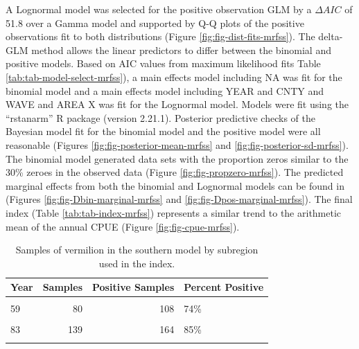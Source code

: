 \documentclass[
  english,
  a4paper,
]{article}
\begin{document}
A Lognormal model was
selected for the positive observation GLM by
a \(\Delta AIC\) of 51.8 over a Gamma model and supported by Q-Q plots of the positive observations fit to both distributions (Figure \ref{fig:fig-dist-fits-mrfss}). The delta-GLM
method allows the linear predictors to differ between the binomial and positive models.
Based on AIC values from maximum likelihood fits Table \ref{tab:tab-model-select-mrfss}),
a main effects model including
NA
was fit for the binomial model and a main
effects model including
YEAR and CNTY and WAVE and AREA X
was fit for the Lognormal model.
Models were fit using the ``rstanarm'' R package (version 2.21.1). Posterior predictive
checks of the Bayesian model fit for the binomial model and the positive model
were all reasonable (Figures \ref{fig:fig-posterior-mean-mrfss} and
\ref{fig:fig-posterior-sd-mrfss}). The binomial model generated data sets with the
proportion zeros similar to the
30\%
zeroes in the observed data (Figure \ref{fig:fig-propzero-mrfss}).
The predicted marginal effects from both the binomial and Lognormal models
can be found in (Figures \ref{fig:fig-Dbin-marginal-mrfss} and
\ref{fig:fig-Dpos-marginal-mrfss}). The final index (Table \ref{tab:tab-index-mrfss})
represents a similar trend to the arithmetic mean of the annual CPUE (Figure \ref{fig:fig-cpue-mrfss}).

\newpage

\begin{table}

\caption{\label{tab:tab-region-mrfss}Samples of vermilion in the southern model by subregion used in the index.}
\centering
\begin{tabular}[t]{lrrl}
\toprule
Year & Samples & Positive Samples & Percent Positive\\
\midrule
\cellcolor{gray!6}{37} & \cellcolor{gray!6}{163} & \cellcolor{gray!6}{242} & \cellcolor{gray!6}{67\%}\\
59 & 80 & 108 & 74\%\\
\cellcolor{gray!6}{73} & \cellcolor{gray!6}{131} & \cellcolor{gray!6}{209} & \cellcolor{gray!6}{63\%}\\
83 & 139 & 164 & 85\%\\
\cellcolor{gray!6}{111} & \cellcolor{gray!6}{217} & \cellcolor{gray!6}{320} & \cellcolor{gray!6}{68\%}\\
\bottomrule
\end{tabular}
\end{table}
\end{document}
